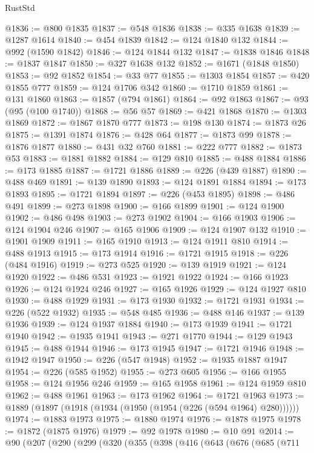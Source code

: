 \begin{lexlean}{RustStd}
\begin{coremodule}
@1836 := @800 @1835
@1837 := @548 @1836
@1838 := @335 @1638
@1839 := @1287 @1614
@1840 := @454 @1839
@1842 := @124 @1840 @132
@1844 := @992 (@1590 @1842)
@1846 := @124 @1844 @132
@1847 := @1838 @1846
@1848 := @1837 @1847
@1850 := @327 @1638 @132
@1852 := @1671 (@1848 @1850)
@1853 := @92 @1852
@1854 := @33 @77
@1855 := @1303 @1854
@1857 := @420 @1855 @777
@1859 := @124 @1706 @342
@1860 := @1710 @1859
@1861 := @131 @1860
@1863 := @1857 (@794 @1861)
@1864 := @92 @1863
@1867 := @93 (@95 (@100 @1740))
@1868 := @56 @57
@1869 := @421 @1868
@1870 := @1303 @1869
@1872 := @1867 @1870 @777
@1873 := @198 @130
@1874 := @1873 @26
@1875 := @1391 @1874
@1876 := @428 @64
@1877 := @1873 @99
@1878 := @1876 @1877
@1880 := @431 @32 @760
@1881 := @222 @777
@1882 := @1873 @53
@1883 := @1881 @1882
@1884 := @129 @810
@1885 := @488 @1884
@1886 := @173 @1885
@1887 := @1721 @1886
@1889 := @226 (@439 @1887)
@1890 := @488 @469
@1891 := @139 @1890
@1893 := @124 @1891 @1884
@1894 := @173 @1893
@1895 := @1721 @1894
@1897 := @226 (@453 @1895)
@1898 := @486 @491
@1899 := @273 @1898
@1900 := @166 @1899
@1901 := @124 @1900
@1902 := @486 @498
@1903 := @273 @1902
@1904 := @166 @1903
@1906 := @124 @1904 @246
@1907 := @165 @1906
@1909 := @124 @1907 @132
@1910 := @1901 @1909
@1911 := @165 @1910
@1913 := @124 @1911 @810
@1914 := @488 @1913
@1915 := @173 @1914
@1916 := @1721 @1915
@1918 := @226 (@484 @1916)
@1919 := @273 @525
@1920 := @139 @1919
@1921 := @124 @1920
@1922 := @486 @531
@1923 := @1921 @1922
@1924 := @166 @1923
@1926 := @124 @1924 @246
@1927 := @165 @1926
@1929 := @124 @1927 @810
@1930 := @488 @1929
@1931 := @173 @1930
@1932 := @1721 @1931
@1934 := @226 (@522 @1932)
@1935 := @548 @485
@1936 := @488 @146
@1937 := @139 @1936
@1939 := @124 @1937 @1884
@1940 := @173 @1939
@1941 := @1721 @1940
@1942 := @1935 @1941
@1943 := @271 @1770
@1944 := @129 @1943
@1945 := @488 @1944
@1946 := @173 @1945
@1947 := @1721 @1946
@1948 := @1942 @1947
@1950 := @226 (@547 @1948)
@1952 := @1935 @1887 @1947
@1954 := @226 (@585 @1952)
@1955 := @273 @605
@1956 := @166 @1955
@1958 := @124 @1956 @246
@1959 := @165 @1958
@1961 := @124 @1959 @810
@1962 := @488 @1961
@1963 := @173 @1962
@1964 := @1721 @1963
@1973 := @1889 (@1897 (@1918 (@1934 (@1950 (@1954 (@226 (@594 @1964) @280))))))
@1974 := @1883 @1973
@1975 := @1880 @1974
@1976 := @1878 @1975
@1978 := @1872 (@1875 @1976)
@1979 := @92 @1978
@1980 := @10 @91
@2014 := @90
    (@207
      (@290
        (@299
          (@320
            (@355
              (@398
                (@416
                  (@643
                    (@676
                      (@685
                        (@711

\end{coremodule}
\end{lexlean}
